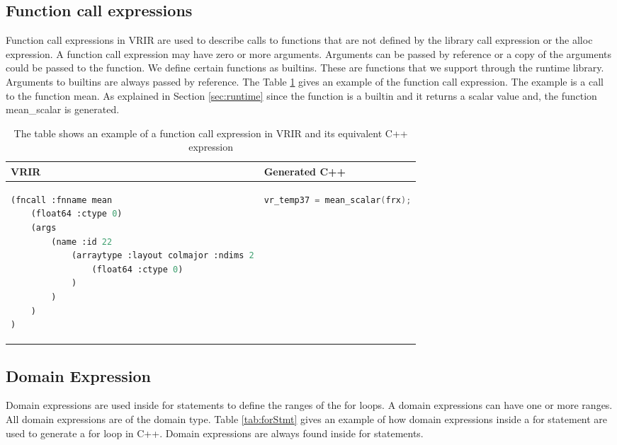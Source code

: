 \subsection{Function call expressions}
Function call expressions in VRIR are used to describe calls to functions that are not defined by  the library call expression or the alloc expression. A function call expression may have zero or more arguments. Arguments can be passed by reference or a copy of the arguments could be passed to the function. We define certain functions as builtins. These are functions that we support through the runtime library. Arguments to builtins are always passed by reference. The Table \ref{tab:funCallExpr} gives an example of the function call expression. The example is a call to the function \textsf{mean}. As explained in Section \ref{sec:runtime} since the function is a builtin and it returns a scalar value and, the function \textsf{mean\_scalar} is generated. 
\begin{table}[htbp]
\centering
\begin{tabular}{|l|l|}
\hline

VRIR &  Generated C++ \\
\hline
{
\begin{lstlisting}[language=lisp,frame=none, numbers=none]
(fncall :fnname mean
	(float64 :ctype 0)
	(args
		(name :id 22
   			(arraytype :layout colmajor :ndims 2
				(float64 :ctype 0)
			)
		)
	)
)
\end{lstlisting}
}
&
{
\begin{lstlisting}[language=c,frame=none, numbers=none]
 vr_temp37 = mean_scalar(frx);
\end{lstlisting}
} \\
\hline
\end{tabular}
\caption[Function call Expression example]{The table shows an example of a function call expression in VRIR and its equivalent C++ expression}
\label{tab:funCallExpr}
\end{table}
\subsection{Domain Expression}
\label{subsec:domainExpr}
Domain expressions are used inside for statements to define the ranges of the for loops. A domain expressions can have one or more ranges. All domain expressions are of the domain type. Table \ref{tab:forStmt} gives an example of how domain expressions inside a for statement are used to generate a for loop in C++. Domain expressions are always found inside for statements. 
